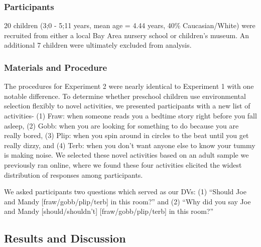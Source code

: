 \documentclass[10pt, letterpaper]{article}
\begin{document}
\hypertarget{participants-1}{%
\subsubsection{Participants}\label{participants-1}}

20 children (3;0 - 5;11 years, mean age = 4.44 years, 40\%
Caucasian/White) were recruited from either a local Bay Area nursery
school or children's museum. An additional 7 children were ultimately
excluded from analysis.

\hypertarget{materials-and-procedure-1}{%
\subsubsection{Materials and
Procedure}\label{materials-and-procedure-1}}

The procedures for Experiment 2 were nearly identical to Experiment 1
with one notable difference. To determine whether preschool children use
environmental selection flexibly to novel activities, we presented
participants with a new list of activities- (1) Fraw: when someone reads
you a bedtime story right before you fall asleep, (2) Gobb: when you are
looking for something to do because you are really bored, (3) Plip: when
you spin around in circles to the beat until you get really dizzy, and
(4) Terb: when you don't want anyone else to know your tummy is making
noise. We selected these novel activities based on an adult sample we
previously ran online, where we found these four activities elicited the
widest distribution of responses among participants.

We asked participants two questions which served as our DVs: (1)
``Should Joe and Mandy {[}fraw/gobb/plip/terb{]} in this room?'' and (2)
``Why did you say Joe and Mandy {[}should/shouldn't{]}
{[}fraw/gobb/plip/terb{]} in this room?''

\hypertarget{results-and-discussion-1}{%
\subsection{Results and Discussion}\label{results-and-discussion-1}}
\end{document}
